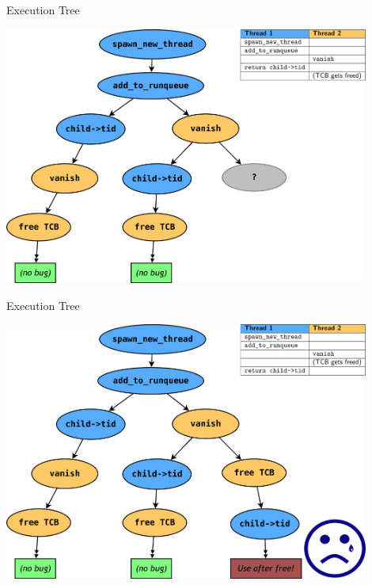\documentclass[xcolor=dvipsnames]{beamer}
\begin{document}
\begin{frame}{Execution Tree}
	\begin{center}
		\includegraphics[width=0.9\textwidth]{threadfork1.png}
	\end{center}
\end{frame}
\begin{frame}{Execution Tree}
	\begin{center}
		\includegraphics[width=0.9\textwidth]{threadfork2.png}
	\end{center}
\end{frame}


\end{document}
